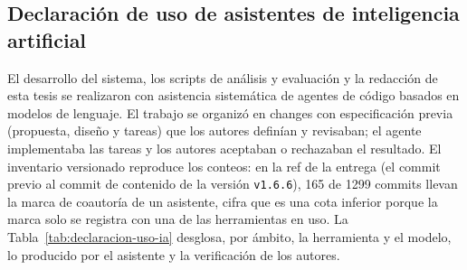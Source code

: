 \newpage

\subsection{Declaración de uso de asistentes de inteligencia artificial}\label{subsec:declaracion-uso-ia}

El desarrollo del sistema, los scripts de análisis y evaluación y la redacción de esta tesis se realizaron con asistencia sistemática de agentes de código basados en modelos de lenguaje. El trabajo se organizó en changes con especificación previa (propuesta, diseño y tareas) que los autores definían y revisaban; el agente implementaba las tareas y los autores aceptaban o rechazaban el resultado. El inventario versionado  reproduce los conteos: en la ref de la entrega (el commit previo al commit de contenido de la versión \texttt{v1.6.6}), 165 de 1299 commits llevan la marca de coautoría de un asistente, cifra que es una cota inferior porque la marca solo se registra con una de las herramientas en uso. La Tabla~\ref{tab:declaracion-uso-ia} desglosa, por ámbito, la herramienta y el modelo, lo producido por el asistente y la verificación de los autores.

